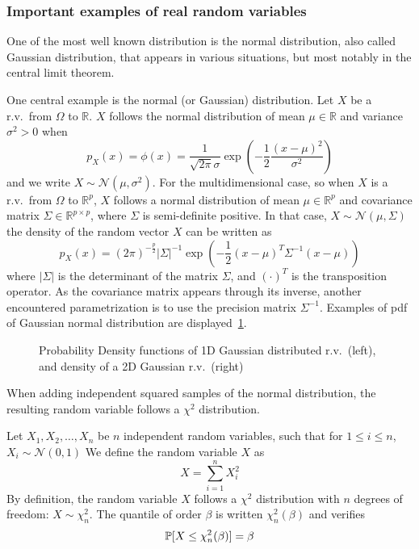 \documentclass[../../Main_ManuscritThese.tex]{subfiles}
\newcommand\imgpath{/home/victor/acadwriting/Manuscrit/Text/Chapter2/img/}
\begin{document}
\subsubsection{Important examples of real random variables}
One of the most well known distribution is the normal distribution, also called Gaussian distribution, that appears in various situations, but most notably in the central limit theorem.
\begin{example}
  \label{ex:gaussian_distribution}
  One central example is the normal (or Gaussian) distribution. Let $X$ be a r.v.\ from $\Omega$ to $\mathbb{R}$.
  $X$ follows the normal distribution of mean $\mu \in \mathbb{R}$ and variance $\sigma^2>0$ when
  \begin{equation}
    p_X(x) = \phi(x) = \frac{1}{\sqrt{2\pi}\sigma}\exp\left(-\frac{1}{2}\frac{(x-\mu)^2}{\sigma^2}\right)
  \end{equation}
and we write $X \sim \mathcal{N}(\mu,\sigma^2)$.
For the multidimensional case, so when $X$ is a r.v.\ from $\Omega$ to $\mathbb{R}^p$,
$X$ follows a normal distribution of mean $\mu \in \mathbb{R}^p$ and covariance matrix $\Sigma \in \mathbb{R}^{p\times p}$, where $\Sigma$ is semi-definite positive.
In that case, $X\sim \mathcal{N}(\mu, \Sigma)$ the density of the random vector $X$ can be written as
\begin{equation}
    p_X(x) = (2\pi)^{-\frac{p}{2}}\lvert\Sigma\rvert^{-1}\exp\left(-\frac{1}{2}(x-\mu)^T\Sigma^{-1}(x-\mu)\right)
  \end{equation}
  where $|\Sigma|$ is the determinant of the matrix $\Sigma$, and $(\cdot)^T$ is the transposition operator.
  As the covariance matrix appears through its inverse, another encountered parametrization is to use the precision matrix $\Sigma^{-1}$.
  Examples of pdf of Gaussian normal distribution are displayed~\cref{fig:example_normal}.
\end{example}
\begin{figure}[!h]
  \centering
  
  \caption{Probability Density functions of 1D Gaussian distributed r.v.\ (left), and density of a 2D Gaussian r.v.\ (right)}
  \label{fig:example_normal}
\end{figure}
When adding independent squared samples of the normal distribution, the resulting random variable follows a $\chi^2$ distribution.
\begin{example}
  \label{ex:chi2}
  Let $X_1, X_2,\dots,X_n$ be $n$ independent random variables, such that for $1\leq i \leq n$, $X_i \sim \mathcal{N}(0,1)$
  We define the random variable $X$ as
  \begin{equation}
    X = \sum_{i=1}^n X_i^2
  \end{equation}
  By definition, the random variable $X$ follows a $\chi^2$ distribution with $n$ degrees of freedom: $X\sim \chi^2_n$. The quantile of order $\beta$ is written $\chi^2_n(\beta)$ and verifies
  \begin{equation}
    \mathbb{P}[X \leq \chi^2_n(\beta)] = \beta 
  \end{equation}
\end{example}
\end{document}
